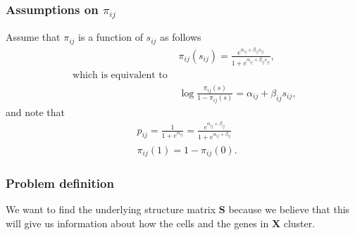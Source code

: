 \documentclass[12pt]{article}
\begin{document}
\subsubsection*{Assumptions on $\pi_{ij}$} %
Assume that $\pi_{ij}$ is a function of $s_{ij}$ as follows
\begin{align} \label{eq:Link}
  & \pi_{ij}(s_{ij}) = \frac{e^{\alpha_{ij} + \beta_{ij} s_{ij}}}{1 + e^{\alpha_{ij} + \beta_{ij} s_{ij}}}, \\
 \text{ which is equivalent to } \nonumber \\
  & \log \frac{\pi_{ij}(s)}{1-\pi_{ij}(s)}  = \alpha_{ij} + \beta_{ij} s_{ij},  \nonumber
\end{align}
and note that
\begin{align} \label{eq:p_alpha_pi}
  & p_{ij} =  \frac{1}{1 + e^{\alpha_{ij}}} =  \frac{e^{\alpha_{ij} + \beta_{ij}}}{1 + e^{\alpha_{ij} + \beta_{ij}}} \\
  & \pi_{ij}(1)  = 1 - \pi_{ij}(0). \nonumber
\end{align}

\subsubsection*{Problem definition} %
We want to find the underlying structure matrix $\mathbf{S}$ because we believe that this will give us information about how the cells and the genes in $\mathbf{X}$ cluster. 
\end{document}
